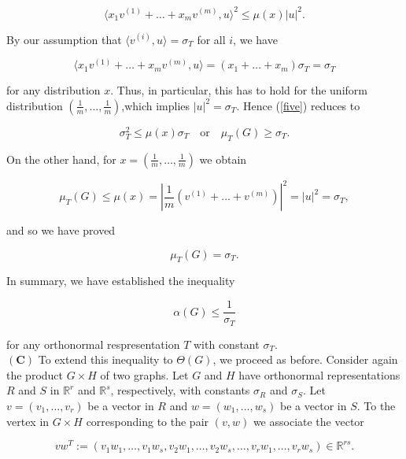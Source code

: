 \documentclass[openany,12pt]{memoir}
\newcommand{\setnewpagemargins}{
    \clearpage
    \setulmarginsandblock{2cm}{0.5cm}{*}
    \checkandfixthelayout
}
\begin{document}
\begin{equation}
  \langle x_{1}v^{(1)}+\ldots+x_{m}v^{(m)},u \rangle ^2 \leq \mu(x) |u|^2. \label{five} \label{five}
\end{equation}

By our assumption that $\langle v^{(i)}, u \rangle = \sigma_T$ for all $i$, we have

\[
\langle x_{1}v^{(1)}+\ldots+x_{m}v^{(m)},u\rangle = (x_1 + \ldots + x_m)\sigma_T = \sigma_T
\]

for any distribution $x$. Thus, in particular, this has to hold for the uniform 
distribution $(\frac{1}{m}, \ldots, \frac{1}{m})$,which implies $|u|^2 = \sigma_T$.
Hence (\ref{five}) reduces to 

\begin{equation*}
\sigma_T^2 \leq \mu(x)\sigma_T \quad \text{or} \quad \mu_{T}(G) \geq \sigma_T.
\end{equation*}

\setnewpagemargins
On the other hand, for $x = (\frac{1}{m}, \ldots, \frac{1}{m})$  we obtain

\[
\mu_{T}(G) \leq \mu(x) = |{\frac{1}{m}}(v^{(1)}+\ldots+v^{(m)})|^2 = |u|^2 = \sigma_T,
\]

and so we have proved 

\begin{equation}
\mu_{T}(G) = \sigma_T. \label{six}
\end{equation}

In summary, we have established the inequality 

\begin{equation}
    \alpha(G) \leq {\frac{1}{\sigma_T}} \label{seven}  
\end{equation}

for any orthonormal respresentation $T$ with constant $\sigma_T$.\\
$\mathbf{(C)}$ To extend this inequality to $\Theta(G)$, we proceed as before. Consider 
again the product $G \times H$ of two graphs. Let $G$ and $H$ have orthonormal 
representations $R$ and $S$ in $\mathbb{R}^r$ and $\mathbb{R}^s$, respectively, with constants $\sigma_R$ and $\sigma_S$.
Let $v = (v_1,\ldots,v_r)$ be a vector in $R$ and $w = (w_1,\ldots,w_s)$ be 
a vector in $S$. To the vertex in $G \times H$ corresponding to the pair $(v, w)$ we 
associate the vector

\[
vw^T := ({v_1}{w_1},\ldots,{v_1}{w_s},{v_2}{w_1},\ldots,{v_2}{w_s},\ldots,{v_r}{w_1},\ldots,{v_r}{w_s}) \in \mathbb{R}^{rs}.
\]
\end{document}
